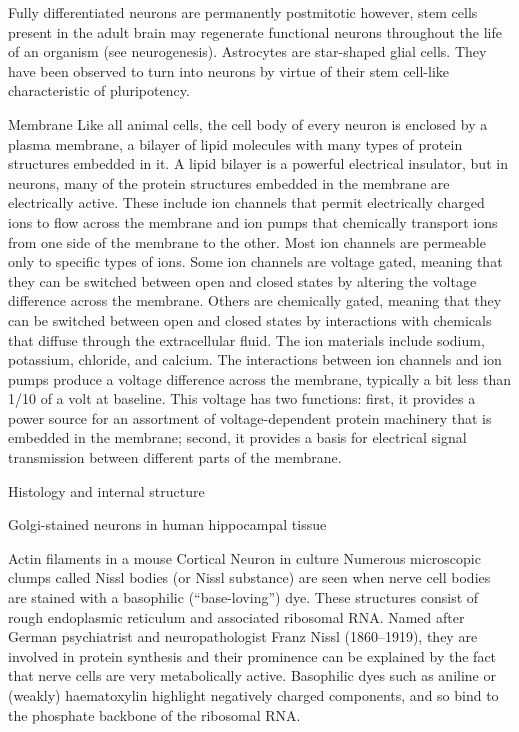 \documentclass[]{book}
\begin{document}
Fully differentiated neurons are permanently postmitotic however, stem cells present in the adult brain may regenerate functional neurons throughout the life of an organism (see neurogenesis). Astrocytes are star-shaped glial cells. They have been observed to turn into neurons by virtue of their stem cell-like characteristic of pluripotency.

Membrane
Like all animal cells, the cell body of every neuron is enclosed by a plasma membrane, a bilayer of lipid molecules with many types of protein structures embedded in it. A lipid bilayer is a powerful electrical insulator, but in neurons, many of the protein structures embedded in the membrane are electrically active. These include ion channels that permit electrically charged ions to flow across the membrane and ion pumps that chemically transport ions from one side of the membrane to the other. Most ion channels are permeable only to specific types of ions. Some ion channels are voltage gated, meaning that they can be switched between open and closed states by altering the voltage difference across the membrane. Others are chemically gated, meaning that they can be switched between open and closed states by interactions with chemicals that diffuse through the extracellular fluid. The ion materials include sodium, potassium, chloride, and calcium. The interactions between ion channels and ion pumps produce a voltage difference across the membrane, typically a bit less than 1/10 of a volt at baseline. This voltage has two functions: first, it provides a power source for an assortment of voltage-dependent protein machinery that is embedded in the membrane; second, it provides a basis for electrical signal transmission between different parts of the membrane.

Histology and internal structure

Golgi-stained neurons in human hippocampal tissue

Actin filaments in a mouse Cortical Neuron in culture
Numerous microscopic clumps called Nissl bodies (or Nissl substance) are seen when nerve cell bodies are stained with a basophilic (``base-loving'') dye. These structures consist of rough endoplasmic reticulum and associated ribosomal RNA. Named after German psychiatrist and neuropathologist Franz Nissl (1860--1919), they are involved in protein synthesis and their prominence can be explained by the fact that nerve cells are very metabolically active. Basophilic dyes such as aniline or (weakly) haematoxylin highlight negatively charged components, and so bind to the phosphate backbone of the ribosomal RNA.
\end{document}
